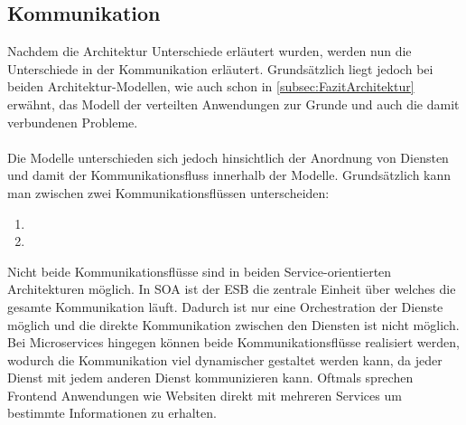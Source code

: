 \subsection{Kommunikation}
\label{subsec:FazitKommunikation}
Nachdem die Architektur Unterschiede erläutert wurden, werden nun die Unterschiede in der Kommunikation erläutert. Grundsätzlich liegt jedoch bei beiden Architektur-Modellen, wie auch schon in \ref{subsec:FazitArchitektur}  erwähnt, das Modell der verteilten Anwendungen zur Grunde und auch die damit verbundenen Probleme.
\\\\
Die Modelle unterschieden sich jedoch hinsichtlich der Anordnung von Diensten und damit der Kommunikationsfluss innerhalb der Modelle. Grundsätzlich kann man zwischen zwei Kommunikationsflüssen unterscheiden:
\begin{enumerate}
    \item {}
    \item {}
\end{enumerate}
Nicht beide Kommunikationsflüsse sind in beiden Service-orientierten Architekturen möglich. In SOA ist der ESB die zentrale Einheit über welches die gesamte Kommunikation läuft. Dadurch ist nur eine Orchestration der Dienste möglich und die direkte Kommunikation  zwischen den Diensten ist nicht möglich. Bei Microservices hingegen können beide Kommunikationsflüsse realisiert werden, wodurch die Kommunikation viel dynamischer gestaltet werden kann, da jeder Dienst mit jedem anderen Dienst kommunizieren kann. Oftmals sprechen Frontend Anwendungen wie Websiten direkt mit mehreren Services um bestimmte Informationen zu erhalten.

